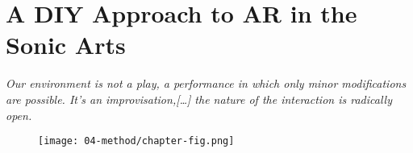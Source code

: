 \chapter{A DIY Approach to AR in the Sonic Arts}
\label{sec: method}
\epigraph{\emph{Our environment is not a play, a performance in which only minor modifications are possible. It's an improvisation,[…] the nature of the interaction is radically open.}}{\citep{vermeulen2015}}

\begin{figure}
    \centering
    \texttt{[image: 04-method/chapter-fig.png]}
    \captionsetup{labelformat=empty}
    \caption[\autoref*{sec: method}'s page-figure: Photographs from the Embodiment Hackathon at Sussex, April 30th - May 1st, (from \citeauthor{bonarjee2022}, \citeyear{bonarjee2022})]{}
\end{figure}

\clearpage

